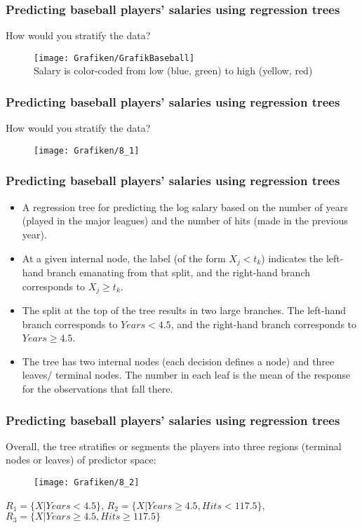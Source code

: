 \documentclass{beamer}
\begin{document}
\begin{frame}\frametitle{Predicting baseball players' salaries using regression trees}
How would you stratify the data?
\begin{figure}
		\centering
		\hspace*{-1.3cm}
		\texttt{[image: Grafiken/GrafikBaseball]} \\
Salary is color-coded from low (blue, green) to high (yellow, red)
	\end{figure}
\end{frame}

\begin{frame}\frametitle{Predicting baseball players' salaries using regression trees}
How would you stratify the data?
\begin{figure}
		\centering
		\hspace*{-1.3cm}
		\texttt{[image: Grafiken/8\_1]}
	\end{figure}
\end{frame}

\begin{frame}\frametitle{Predicting baseball players' salaries using regression trees}
	\begin{itemize}
	  \item A regression tree for predicting the log
salary based on the number of years (played in the major leagues) and the number of hits (made in the previous year).
\vspace*{0.2cm}
\item At a given internal node, the label (of the form $X_j < t_k$)
indicates the left-hand branch emanating from that split, and
the right-hand branch corresponds to $X_j \geq t_k$. \item The
split at the top of the tree results in two large branches. The
left-hand branch corresponds to $Years<4.5$, and the right-hand
branch corresponds to $Years\geq 4.5$.
\vspace*{0.2cm}
\item The tree has two internal nodes (each decision defines a node) and three leaves/ terminal nodes. The number in each leaf is the mean of the response for
the observations that fall there.
	\end{itemize}
\end{frame}

\begin{frame}\frametitle{Predicting baseball players' salaries using regression trees}
Overall, the tree stratifies or segments the players into
three regions (terminal nodes or leaves) of predictor space:
\begin{figure}
		\centering
		\hspace*{-1.3cm}
		\texttt{[image: Grafiken/8\_2]}
	\end{figure}
$R_1=\{X|Years < 4.5\}$, $R_2=\{X|Years\geq 4.5, Hits< 117.5\}$,\\$R_3=\{X|Years\geq 4.5, Hits\geq 117.5\}$
\end{frame}
\end{document}
